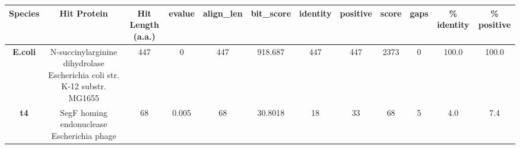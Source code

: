 \begin{tabular}{|c|c|c|c|c|c|c|c|c|c|c|c|} \hline
\textbf{Species} & \textbf{Hit Protein} & \textbf{Hit Length (a.a.)} & \textbf{evalue} & \textbf{align\_len} & \textbf{bit\_score} & \textbf{identity} & \textbf{positive} & \textbf{score} & \textbf{gaps} & \textbf{\% identity} & \textbf{\% positive} \\ \hline
\textbf{E.coli} & N-succinylarginine dihydrolase Escherichia coli str. K-12 substr. MG1655 & 447 & 0 & 447 & 918.687 & 447 & 447 & 2373 & 0 & 100.0 & 100.0\\
\textbf{t4} & SegF homing endonuclease Escherichia phage  & 68 & 0.005 & 68 & 30.8018 & 18 & 33 & 68 & 5 & 4.0 & 7.4\\
\hline \end{tabular}
